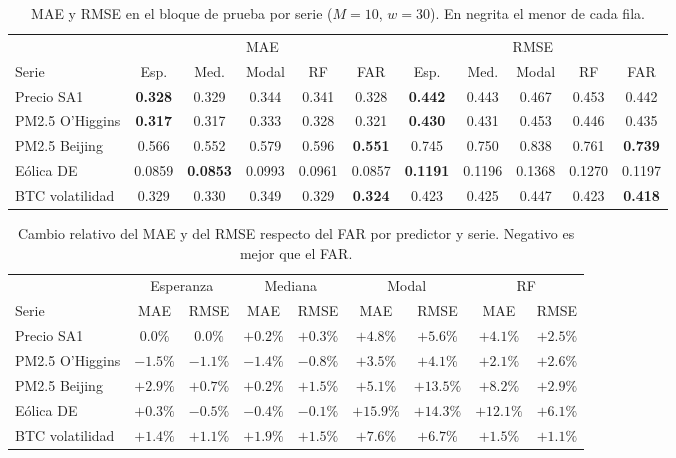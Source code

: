 \begin{table}[H]
\centering\small
\setlength{\tabcolsep}{3.5pt}
\caption{MAE y RMSE en el bloque de prueba por serie ($M = 10$, $w = 30$). En negrita el menor de cada fila.}
\label{tab:aneD_bloqueA}
\begin{tabular}{l ccccc ccccc}
\hline
 & \multicolumn{5}{c}{MAE} & \multicolumn{5}{c}{RMSE} \\
Serie & Esp. & Med. & Modal & RF & FAR & Esp. & Med. & Modal & RF & FAR \\
\hline
Precio SA1 & \textbf{0.328} & 0.329 & 0.344 & 0.341 & 0.328 & \textbf{0.442} & 0.443 & 0.467 & 0.453 & 0.442 \\
PM2.5 O'Higgins & \textbf{0.317} & 0.317 & 0.333 & 0.328 & 0.321 & \textbf{0.430} & 0.431 & 0.453 & 0.446 & 0.435 \\
PM2.5 Beijing & 0.566 & 0.552 & 0.579 & 0.596 & \textbf{0.551} & 0.745 & 0.750 & 0.838 & 0.761 & \textbf{0.739} \\
Eólica DE & 0.0859 & \textbf{0.0853} & 0.0993 & 0.0961 & 0.0857 & \textbf{0.1191} & 0.1196 & 0.1368 & 0.1270 & 0.1197 \\
BTC volatilidad & 0.329 & 0.330 & 0.349 & 0.329 & \textbf{0.324} & 0.423 & 0.425 & 0.447 & 0.423 & \textbf{0.418} \\
\hline
\end{tabular}
\end{table}

\begin{table}[H]
\centering\small
\setlength{\tabcolsep}{3.5pt}
\caption{Cambio relativo del MAE y del RMSE respecto del FAR por predictor y serie. Negativo es mejor que el FAR.}
\label{tab:aneD_bloqueA_ganancia}
\begin{tabular}{l cc cc cc cc}
\hline
 & \multicolumn{2}{c}{Esperanza} & \multicolumn{2}{c}{Mediana} & \multicolumn{2}{c}{Modal} & \multicolumn{2}{c}{RF} \\
Serie & MAE & RMSE & MAE & RMSE & MAE & RMSE & MAE & RMSE \\
\hline
Precio SA1 & $0.0\%$ & $0.0\%$ & $+0.2\%$ & $+0.3\%$ & $+4.8\%$ & $+5.6\%$ & $+4.1\%$ & $+2.5\%$ \\
PM2.5 O'Higgins & $-1.5\%$ & $-1.1\%$ & $-1.4\%$ & $-0.8\%$ & $+3.5\%$ & $+4.1\%$ & $+2.1\%$ & $+2.6\%$ \\
PM2.5 Beijing & $+2.9\%$ & $+0.7\%$ & $+0.2\%$ & $+1.5\%$ & $+5.1\%$ & $+13.5\%$ & $+8.2\%$ & $+2.9\%$ \\
Eólica DE & $+0.3\%$ & $-0.5\%$ & $-0.4\%$ & $-0.1\%$ & $+15.9\%$ & $+14.3\%$ & $+12.1\%$ & $+6.1\%$ \\
BTC volatilidad & $+1.4\%$ & $+1.1\%$ & $+1.9\%$ & $+1.5\%$ & $+7.6\%$ & $+6.7\%$ & $+1.5\%$ & $+1.1\%$ \\
\hline
\end{tabular}
\end{table}

